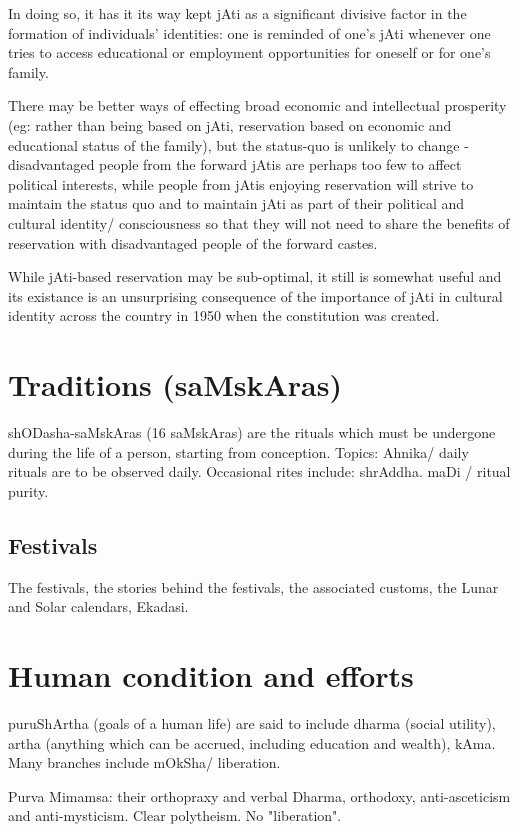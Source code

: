 \documentclass[oneside, article]{memoir}
\begin{document}
In doing so, it has it its way kept jAti as a significant divisive factor in the formation of individuals' identities: one is reminded of one's jAti whenever one tries to access educational or employment opportunities for oneself or for one's family.

There may be better ways of effecting broad economic and intellectual prosperity (eg: rather than being based on jAti, reservation based on economic and educational status of the family), but the status-quo is unlikely to change - disadvantaged people from the forward jAtis are perhaps too few to affect political interests, while people from jAtis enjoying reservation will strive to maintain the status quo and to maintain jAti as part of their political and cultural identity/ consciousness so that they will not need to share the benefits of reservation with disadvantaged people of the forward castes.

While jAti-based reservation may be sub-optimal, it still is somewhat useful and its existance is an unsurprising consequence of the importance of jAti in cultural identity across the country in 1950 when the constitution was created.

\section{Traditions (saMskAras)}
shODasha-saMskAras (16 saMskAras) are the rituals which must be undergone during the life of a person, starting from conception. Topics: Ahnika/ daily rituals are to be observed daily. Occasional rites include: shrAddha. maDi / ritual purity.

\subsection{Festivals}
The festivals, the stories behind the festivals, the associated customs, the Lunar and Solar calendars, Ekadasi.

\section{Human condition and efforts}
puruShArtha (goals of a human life) are said to include dharma (social utility), artha (anything which can be accrued, including education and wealth), kAma. Many branches include mOkSha/ liberation.

Purva Mimamsa: their orthopraxy and verbal Dharma, orthodoxy, anti-asceticism and anti-mysticism. Clear polytheism. No "liberation".
\end{document}
